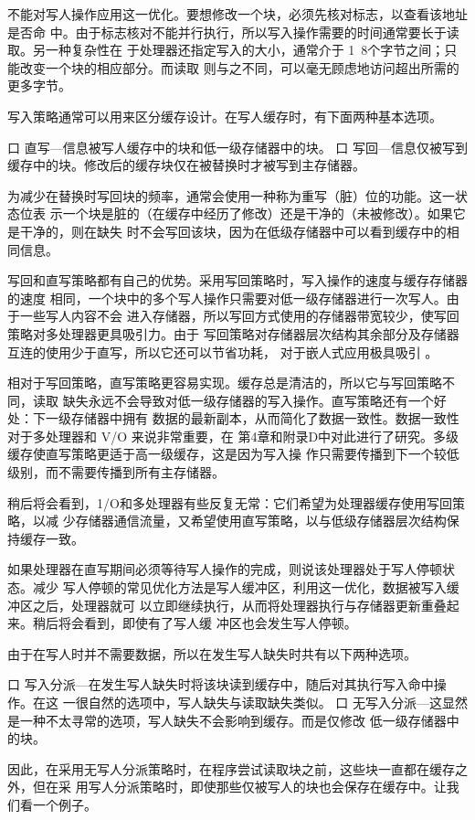 不能对写人操作应用这一优化。要想修改一个块，必须先核对标志，以查看该地址是否命
中。由于标志核对不能并行执行，所以写入操作需要的时间通常要长于读取。另一种复杂性在
于处理器还指定写入的大小，通常介于 1~8个字节之间；只能改变一个块的相应部分。而读取
则与之不同，可以毫无顾虑地访问超出所需的更多字节。

写入策略通常可以用来区分缓存设计。在写人缓存时，有下面两种基本选项。

口 直写—信息被写人缓存中的块和低一级存储器中的块。
口 写回—信息仅被写到缓存中的块。修改后的缓存块仅在被替换时才被写到主存储器。

为减少在替换时写回块的频率，通常会使用一种称为重写（脏）位的功能。这一状态位表
示一个块是脏的（在缓存中经历了修改）还是干净的（未被修改）。如果它是干净的，则在缺失
时不会写回该块，因为在低级存储器中可以看到缓存中的相同信息。

写回和直写策略都有自己的优势。采用写回策略时，写入操作的速度与缓存存储器的速度
相同，一个块中的多个写人操作只需要对低一级存储器进行一次写人。由于一些写人内容不会
进入存储器，所以写回方式使用的存储器带宽较少，使写回策略对多处理器更具吸引力。由于
写回策略对存储器层次结构其余部分及存储器互连的使用少于直写，所以它还可以节省功耗，
对于嵌人式应用极具吸引 。

相对于写回策略，直写策略更容易实现。缓存总是清洁的，所以它与写回策略不同，读取
缺失永远不会导致对低一级存储器的写入操作。直写策略还有一个好处：下一级存储器中拥有
数据的最新副本，从而简化了数据一致性。数据一致性对于多处理器和 V/O 来说非常重要，在
第4章和附录D中对此进行了研究。多级缓存使直写策略更适于高一级缓存，这是因为写入操
作只需要传播到下一个较低级别，而不需要传播到所有主存储器。

稍后将会看到，1/O和多处理器有些反复无常：它们希望为处理器缓存使用写回策略，以减
少存储器通信流量，又希望使用直写策略，以与低级存储器层次结构保持缓存一致。

如果处理器在直写期间必须等待写人操作的完成，则说该处理器处于写人停顿状态。减少
写人停顿的常见优化方法是写人缓冲区，利用这一优化，数据被写入缓冲区之后，处理器就可
以立即继续执行，从而将处理器执行与存储器更新重叠起来。稍后将会看到，即使有了写人缓
冲区也会发生写人停顿。

由于在写人时并不需要数据，所以在发生写人缺失时共有以下两种选项。

口 写入分派—在发生写人缺失时将该块读到缓存中，随后对其执行写入命中操作。在这
一很自然的选项中，写人缺失与读取缺失类似。
口 无写入分派—这显然是一种不太寻常的选项，写人缺失不会影响到缓存。而是仅修改
低一级存储器中的块。

因此，在采用无写人分派策略时，在程序尝试读取块之前，这些块一直都在缓存之外，但在采
用写人分派策略时，即使那些仅被写人的块也会保存在缓存中。让我们看一个例子。

